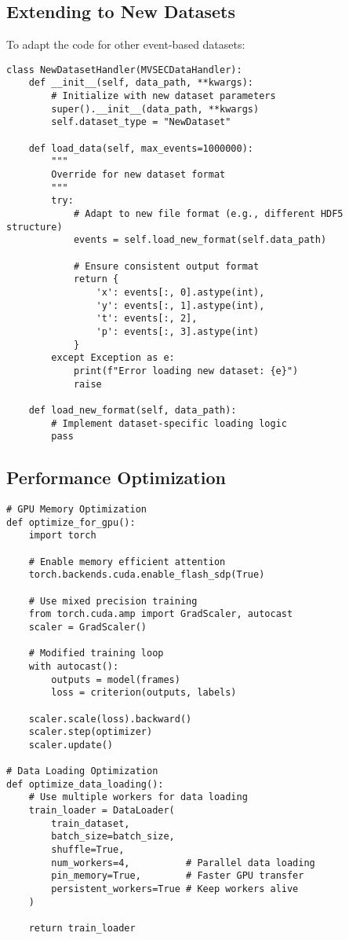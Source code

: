 \documentclass[12pt,a4paper]{article}
\begin{document}
\subsection{Extending to New Datasets}

To adapt the code for other event-based datasets:

\begin{lstlisting}[caption={Dataset Adaptation Template}]
class NewDatasetHandler(MVSECDataHandler):
    def __init__(self, data_path, **kwargs):
        # Initialize with new dataset parameters
        super().__init__(data_path, **kwargs)
        self.dataset_type = "NewDataset"
    
    def load_data(self, max_events=1000000):
        """
        Override for new dataset format
        """
        try:
            # Adapt to new file format (e.g., different HDF5 structure)
            events = self.load_new_format(self.data_path)
            
            # Ensure consistent output format
            return {
                'x': events[:, 0].astype(int),
                'y': events[:, 1].astype(int),
                't': events[:, 2],
                'p': events[:, 3].astype(int)
            }
        except Exception as e:
            print(f"Error loading new dataset: {e}")
            raise
    
    def load_new_format(self, data_path):
        # Implement dataset-specific loading logic
        pass
\end{lstlisting}

\subsection{Performance Optimization}

\begin{lstlisting}[caption={Optimization Techniques}]
# GPU Memory Optimization
def optimize_for_gpu():
    import torch
    
    # Enable memory efficient attention
    torch.backends.cuda.enable_flash_sdp(True)
    
    # Use mixed precision training
    from torch.cuda.amp import GradScaler, autocast
    scaler = GradScaler()
    
    # Modified training loop
    with autocast():
        outputs = model(frames)
        loss = criterion(outputs, labels)
    
    scaler.scale(loss).backward()
    scaler.step(optimizer)
    scaler.update()

# Data Loading Optimization
def optimize_data_loading():
    # Use multiple workers for data loading
    train_loader = DataLoader(
        train_dataset, 
        batch_size=batch_size,
        shuffle=True,
        num_workers=4,          # Parallel data loading
        pin_memory=True,        # Faster GPU transfer
        persistent_workers=True # Keep workers alive
    )
    
    return train_loader
\end{lstlisting}
\end{document}
